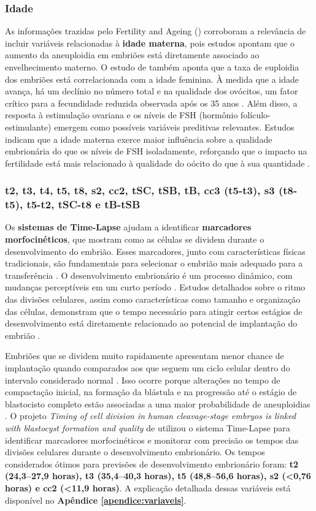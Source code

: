 \subsubsection{Idade}
As informações trazidas pelo Fertility and Ageing () corroboram a relevância de incluir variáveis relacionadas à \textbf{idade materna}, pois estudos apontam que o aumento da aneuploidia em embriões está diretamente associado ao envelhecimento materno. O estudo de  também aponta que a taxa de euploidia dos embriões está correlacionada com a idade feminina. À medida que a idade avança, há um declínio no número total e na qualidade dos ovócitos, um fator crítico para a fecundidade reduzida observada após os 35 anos \cite{yuan2023}. Além disso, a resposta à estimulação ovariana e os níveis de FSH (hormônio folículo-estimulante) emergem como possíveis variáveis preditivas relevantes. Estudos indicam que a idade materna exerce maior influência sobre a qualidade embrionária do que os níveis de FSH isoladamente, reforçando que o impacto na fertilidade está mais relacionado à qualidade do oócito do que à sua quantidade \cite{eshre2005}.

\subsubsection{t2, t3, t4, t5, t8, s2, cc2, tSC, tSB, tB, cc3 (t5-t3), s3 (t8-t5), t5-t2,  tSC-t8 e tB-tSB}
Os \textbf{sistemas de Time-Lapse} ajudam a identificar \textbf{marcadores morfocinéticos}, que mostram como as células se dividem durante o desenvolvimento do embrião. Esses marcadores, junto com características físicas tradicionais, são fundamentais para selecionar o embrião mais adequado para a transferência \cite{souzarebeca2022}. O desenvolvimento embrionário é um processo dinâmico, com mudanças perceptíveis em um curto período \cite{cruz2012}. Estudos detalhados sobre o ritmo das divisões celulares, assim como características como tamanho e organização das células, demonstram que o tempo necessário para atingir certos estágios de desenvolvimento está diretamente relacionado ao potencial de implantação do embrião \cite{souzarebeca2022}.

Embriões que se dividem muito rapidamente apresentam menor chance de implantação quando comparados aos que seguem um ciclo celular dentro do intervalo considerado normal  \cite{cruz2012}. Isso ocorre porque alterações no tempo de compactação inicial, na formação da blástula e na progressão até o estágio de blastocisto completo estão associadas a uma maior probabilidade de aneuploidias \cite{cruz2012}. O projeto \textit{Timing of cell division in human cleavage-stage embryos is linked with blastocyst formation and quality} de  utilizou o sistema Time-Lapse para identificar marcadores morfocinéticos e monitorar com precisão os tempos das divisões celulares durante o desenvolvimento embrionário. Os tempos considerados ótimos para previsões de desenvolvimento embrionário foram: \textbf{t2 (24,3–27,9 horas), t3 (35,4–40,3 horas), t5 (48,8–56,6 horas), s2 (<0,76 horas) e cc2 (<11,9 horas)}. A explicação detalhada dessas variáveis está disponível no \textbf{Apêndice \ref{apendice:variaveis}}. 

